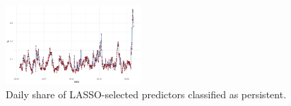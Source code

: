 \documentclass[10pt,twocolumn]{article}
\begin{document}
\begin{figure}[h!] %
    \centering
    \includegraphics[width=0.45\textwidth]{dately_share_plot.png} 
    \caption{Daily share of LASSO-selected predictors classified as persistent.}
    \label{fig:persistence} %
\end{figure}
\printbibliography
\end{document}

